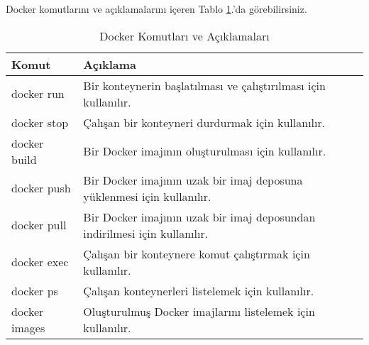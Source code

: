 Docker komutlarını ve açıklamalarını içeren Tablo \ref{tab:docker-komutlar}.'da görebilirsiniz.
\begin{table}[h]
  \centering
  \caption{Docker Komutları ve Açıklamaları}
  \label{tab:docker-komutlar}
  \begin{tabular}{|p{}|p{}|}
  \hline
  \textbf{Komut} & \textbf{Açıklama} \\ \hline
  docker run & Bir konteynerin başlatılması ve çalıştırılması için kullanılır. \\ \hline
  docker stop & Çalışan bir konteyneri durdurmak için kullanılır. \\ \hline
  docker build & Bir Docker imajının oluşturulması için kullanılır. \\ \hline
  docker push & Bir Docker imajının uzak bir imaj deposuna yüklenmesi için kullanılır. \\ \hline
  docker pull & Bir Docker imajının uzak bir imaj deposundan indirilmesi için kullanılır. \\ \hline
  docker exec & Çalışan bir konteynere komut çalıştırmak için kullanılır. \\ \hline
  docker ps & Çalışan konteynerleri listelemek için kullanılır. \\ \hline
  docker images & Oluşturulmuş Docker imajlarını listelemek için kullanılır. \\ \hline
  \end{tabular}
  \end{table}
  

  

